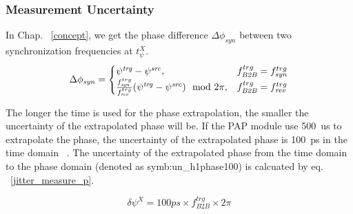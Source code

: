 \subsubsection{Measurement Uncertainty}

In Chap. ~\ref{concept}, we get the phase difference $\Delta \phi_\mathit{syn}$ between two synchronization frequencies at $t_\psi^X$.
\begin{eqnarray}\label{phase_syn}
\Delta \phi_\mathit{syn}=
\begin{cases}
\psi^\mathit{trg}-\psi^\mathit{src}, &f_{\mathit{B2B}}^{trg}=f_{\mathit{syn}}^{trg}\cr
\frac{f_{\mathit{syn}}^{trg}}{f_{\mathit{rev}}^{trg}}(\psi^\mathit{trg}-\psi^\mathit{src}) \mod 2\pi, &f_{\mathit{B2B}}^{trg}=f_{\mathit{rev}}^{trg}\cr
\end{cases}
\end{eqnarray}

The longer the time is used for the phase extrapolation, the smaller the uncertainty of the extrapolated phase will be. If the PAP module use \SI{500}{us} to extrapolate the phase, the uncertainty of the extrapolated phase is \SI{100}{ps} in the time domain ~\cite{ferrand_development_????}. The uncertainty of the extrapolated phase from the time domain to the phase domain (denoted as \gls{symb:un_h1phase100}) is calcuated by eq. ~\ref{jitter_measure_p}.

\begin{equation} 
\delta \psi^{X}=100ps \times f_\mathit{B2B}^\mathit{trg} \times {2\pi}
\label{jitter_measure_p}
\end{equation}



